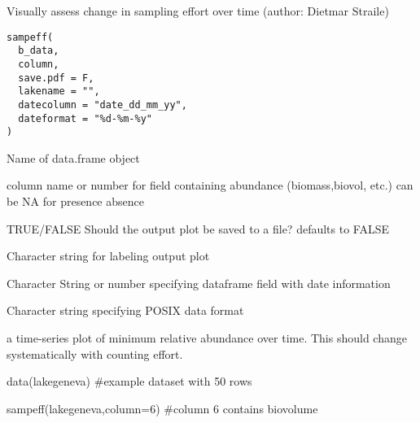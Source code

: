 \documentclass[a4paper]{book}
\begin{document}
%
\begin{Description}\relax
Visually assess change in sampling effort over time (author: Dietmar Straile)
\end{Description}
%
\begin{Usage}
\begin{verbatim}
sampeff(
  b_data,
  column,
  save.pdf = F,
  lakename = "",
  datecolumn = "date_dd_mm_yy",
  dateformat = "%d-%m-%y"
)
\end{verbatim}
\end{Usage}
%
\begin{Arguments}
\begin{ldescription}
\item[\code{b\_data}] Name of data.frame object

\item[\code{column}] column name or number for field containing abundance (biomass,biovol, etc.)
can be NA for presence absence

\item[\code{save.pdf}] TRUE/FALSE Should the output plot be saved to a file? defaults to FALSE

\item[\code{lakename}] Character string for labeling output plot

\item[\code{datecolumn}] Character String or number specifying dataframe field with date information

\item[\code{dateformat}] Character string specifying POSIX data format
\end{ldescription}
\end{Arguments}
%
\begin{Value}
a time-series plot of minimum relative abundance over time. This should change 
systematically with counting effort.
\end{Value}
%
\begin{Examples}
\begin{ExampleCode}
data(lakegeneva)
#example dataset with 50 rows

sampeff(lakegeneva,column=6) #column 6 contains biovolume
\end{ExampleCode}
\end{Examples}
\end{document}

